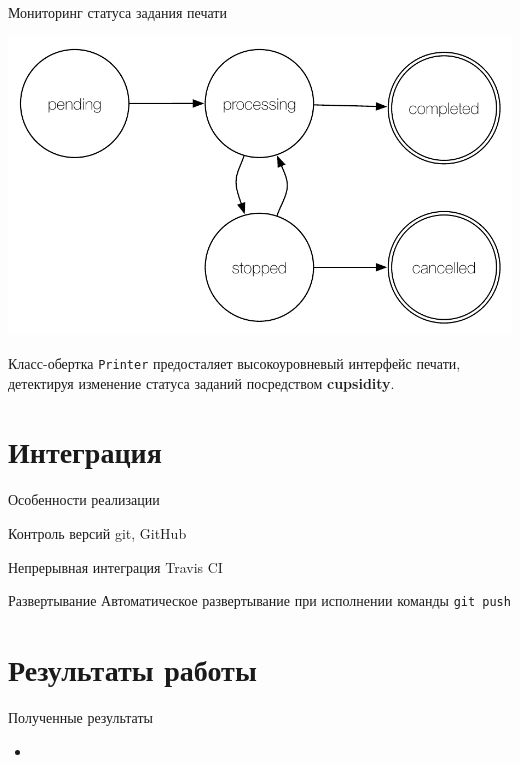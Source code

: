 \documentclass[utf-8]{beamer}
\begin{document}
\begin{frame}{Мониторинг статуса задания печати}
  \begin{center}
        \includegraphics[scale=0.5]{printer-class-simple.pdf}
  \end{center}
  Класс-обертка \texttt{Printer} предосталяет высокоуровневый интерфейс печати, детектируя изменение статуса заданий
  посредством \textbf{cupsidity}.
\end{frame}


\section{Интеграция}
\begin{frame}{Особенности реализации}

  \begin{block}{Контроль версий}
    git, GitHub
  \end{block}

  \begin{block}{Непрерывная интеграция}
    Travis CI
  \end{block}


  \begin{block}{Развертывание}
    Автоматическое развертывание при исполнении команды \texttt{git push}
  \end{block}

\end{frame}


\section{Результаты работы}
\begin{frame}{Полученные результаты}
  \begin{itemize}
    \item
  \end{itemize}
\end{frame}


%   
%   
\end{document}
